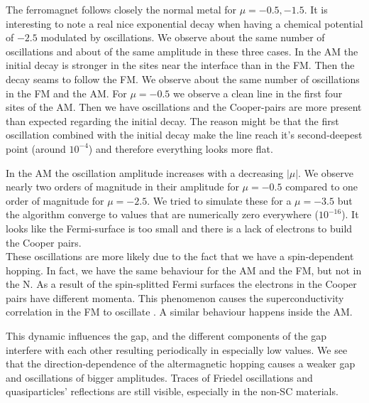 \documentclass[..\main.tex]{subfile}
\begin{document}
The ferromagnet follows closely the normal metal for $\mu=-0.5,-1.5$. It is interesting to note a real nice exponential
decay when having a chemical potential of $-2.5$ modulated by oscillations. We observe about the same number of oscillations and about of
the same amplitude in these three cases. In the AM the initial decay is stronger in the sites near the 
interface than in the FM. Then the decay seams to follow the FM. We observe about the same number of oscillations in the FM and the AM.
For $\mu=-0.5$ we observe a clean line in the first four sites of the AM. Then we have oscillations and the Cooper-pairs are more present
than expected regarding the initial decay. The reason might be that the first oscillation combined with the initial decay make the line
reach it's second-deepest point (around $10^{-4}$) and therefore everything looks more flat.

In the AM the oscillation amplitude increases with a decreasing $|\mu|$.
We observe nearly two orders of magnitude in their amplitude for $\mu=-0.5$ compared to one order of magnitude for $\mu=-2.5$.
We tried to simulate these for a $\mu=-3.5$ but the algorithm  converge to values that are numerically zero everywhere ($10^{-16}$).
It looks like the Fermi-surface is too small and there is a lack of electrons to build the Cooper pairs.\\
 
These oscillations are more likely due to the fact that we have a spin-dependent hopping. In fact, we have the same behaviour for the AM
and the FM, but not in the N. As a result of the spin-splitted Fermi surfaces the electrons in the Cooper pairs have different momenta.
This phenomenon causes the superconductivity correlation in the FM to oscillate \cite{Jong1995}. A similar behaviour happens inside the AM.

This dynamic influences the gap, and the different components of the gap interfere with each other resulting
periodically in especially low values. We see that the direction-dependence of the altermagnetic hopping causes a weaker gap and 
oscillations of bigger amplitudes. Traces of Friedel oscillations and quasiparticles' reflections are still visible, especially in the non-SC materials.\\
\end{document}
